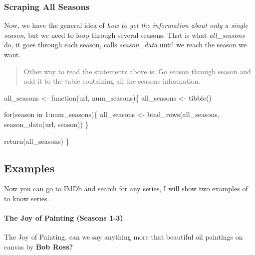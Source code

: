 \documentclass[
  letterpaper,
  DIV=11,
  numbers=noendperiod]{scrartcl}
\let\oldparagraph\paragraph
\renewcommand{\paragraph}[1]{\oldparagraph{#1}\mbox{}}
\newenvironment{Shaded}{\begin{snugshade}}{\end{snugshade}}
\newcommand{\ControlFlowTok}[1]{\textcolor[rgb]{0.00,0.23,0.31}{#1}}
\newcommand{\DecValTok}[1]{\textcolor[rgb]{0.68,0.00,0.00}{#1}}
\newcommand{\FunctionTok}[1]{\textcolor[rgb]{0.28,0.35,0.67}{#1}}
\newcommand{\NormalTok}[1]{\textcolor[rgb]{0.00,0.23,0.31}{#1}}
\newcommand{\OtherTok}[1]{\textcolor[rgb]{0.00,0.23,0.31}{#1}}
\newcommand{\SpecialCharTok}[1]{\textcolor[rgb]{0.37,0.37,0.37}{#1}}
\begin{document}
\hypertarget{scraping-all-seasons}{%
\subsubsection{Scraping All Seasons}\label{scraping-all-seasons}}

Now, we have the general idea of \emph{how to get the information about
only a single season,} but we need to loop through several seasons. That
is what \emph{all\_seasons} do, it goes through each season, calls
\emph{season\_data} until we reach the season we want.

\begin{quote}
Other way to read the statements above is: Go season through season and
add it to the table containing all the seasons information.
\end{quote}

\begin{Shaded}
\begin{Highlighting}[]
\NormalTok{all\_seasons }\OtherTok{\textless{}{-}} \ControlFlowTok{function}\NormalTok{(url, num\_seasons)\{}
\NormalTok{  all\_seasons }\OtherTok{\textless{}{-}} \FunctionTok{tibble}\NormalTok{()}

  \ControlFlowTok{for}\NormalTok{(season }\ControlFlowTok{in} \DecValTok{1}\SpecialCharTok{:}\NormalTok{num\_seasons)\{}
\NormalTok{    all\_seasons }\OtherTok{\textless{}{-}} \FunctionTok{bind\_rows}\NormalTok{(all\_seasons, }\FunctionTok{season\_data}\NormalTok{(url, season))}
\NormalTok{  \}}

  \FunctionTok{return}\NormalTok{(all\_seasons)}
\NormalTok{\}}
\end{Highlighting}
\end{Shaded}

\hypertarget{examples}{%
\subsection{Examples}\label{examples}}

Now you can go to IMDb and search for any series, I will show two
examples of to know series.

\hypertarget{the-joy-of-painting-seasons-1-3}{%
\paragraph{The Joy of Painting (Seasons
1-3)}\label{the-joy-of-painting-seasons-1-3}}

The Joy of Painting, can we say anything more that beautiful oil
paintings on canvas by \textbf{Bob Ross?}
\end{document}
